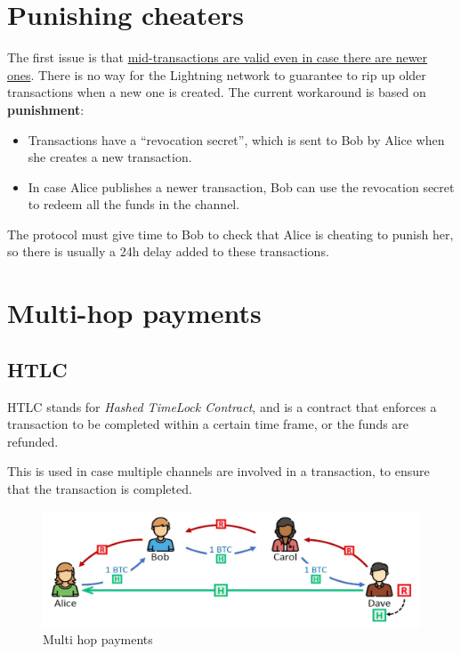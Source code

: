 \section{Punishing cheaters}
The first issue is that \ul{mid-transactions are valid even in case there are newer ones}.
There is no way for the Lightning network to guarantee to rip up older transactions when a new one is created.
The current workaround is based on \textbf{punishment}:
\begin{itemize}
   \item Transactions have a ``revocation secret'', which is sent to Bob by Alice when she creates a new transaction.
   \item In case Alice publishes a newer transaction, Bob can use the revocation secret to redeem all the funds in the channel.
\end{itemize}
The protocol must give time to Bob to check that Alice is cheating to punish her, so there is usually a 24h delay added to these transactions.

\section{Multi-hop payments}
\subsection{HTLC}
HTLC stands for \textit{Hashed TimeLock Contract}, and is a contract that enforces a transaction to be completed within a certain time frame, or the funds are refunded.

This is used in case multiple channels are involved in a transaction, to ensure that the transaction is completed.

\begin{figure}[htbp]
   \centering
   \includegraphics{images/lightning_HTLC1.png}
   \caption{Multi hop payments}
   \label{fig:lightning_HTLC1}
\end{figure}

